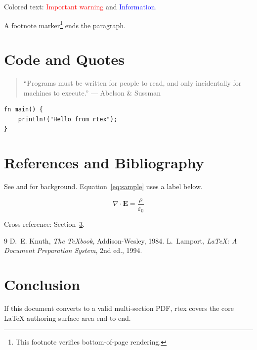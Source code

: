 \documentclass{article}
\begin{document}
Colored text: \textcolor{red}{Important warning} and \textcolor{blue}{Information}.

A footnote marker\footnote{This footnote verifies bottom-of-page rendering.} ends the paragraph.

\section{Code and Quotes}
\begin{quote}
    ``Programs must be written for people to read, and only incidentally for
    machines to execute.'' --- Abelson \& Sussman
\end{quote}

\begin{verbatim}
fn main() {
    println!("Hello from rtex");
}
\end{verbatim}

\section{References and Bibliography}
See \cite{knuth1984} and \cite{lamport1994} for background. Equation~\eqref{eq:sample}
uses a label below.

\begin{equation}
    \label{eq:sample}
    \nabla \cdot \mathbf{E} = \frac{\rho}{\varepsilon_0}
\end{equation}

Cross-reference: Section~\ref{sec:conclusion}.

\begin{thebibliography}{9}
 D.~E. Knuth, \emph{The TeXbook}, Addison-Wesley, 1984.
 L.~Lamport, \emph{LaTeX: A Document Preparation System}, 2nd ed., 1994.
\end{thebibliography}

\section{Conclusion}
\label{sec:conclusion}
If this document converts to a valid multi-section PDF, rtex covers the core
LaTeX authoring surface area end to end.
\end{document}
